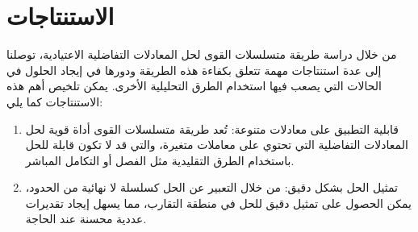 \chapter*{الاستنتاجات}
من خلال دراسة طريقة متسلسلات القوى لحل المعادلات التفاضلية الاعتيادية، توصلنا إلى عدة استنتاجات مهمة تتعلق بكفاءة هذه الطريقة ودورها في إيجاد الحلول في الحالات التي يصعب فيها استخدام الطرق التحليلية الأخرى. يمكن تلخيص أهم هذه الاستنتاجات كما يلي:
\begin{enumerate}
	\item قابلية التطبيق على معادلات متنوعة: تُعد طريقة متسلسلات القوى أداة قوية لحل المعادلات التفاضلية التي تحتوي على معاملات متغيرة، والتي قد لا تكون قابلة للحل باستخدام الطرق التقليدية مثل الفصل أو التكامل المباشر.
	\item  تمثيل الحل بشكل دقيق: من خلال التعبير عن الحل كسلسلة لا نهائية من الحدود، يمكن الحصول على تمثيل دقيق للحل في منطقة التقارب، مما يسهل إيجاد تقديرات عددية محسنة عند الحاجة.
\end{enumerate}


